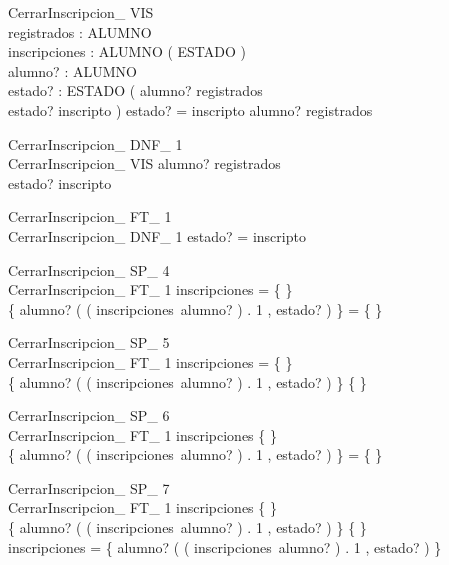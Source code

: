 \documentclass{article}
\begin{document}
\begin{schema}{CerrarInscripcion\_ VIS}\\
  registrados : \power ALUMNO \\
  inscripciones : ALUMNO \pfun ( \nat \cross ESTADO ) \\
  alumno? : ALUMNO \\
  estado? : ESTADO 
 \where
  ( alumno? \in registrados \\
  estado? \neq inscripto ) \lor estado? = inscripto \lor alumno? \notin registrados
 \end{schema}
 
 
 \begin{schema}{CerrarInscripcion\_ DNF\_ 1}\\
  CerrarInscripcion\_ VIS 
 \where
  alumno? \in registrados \\
  estado? \neq inscripto
 \end{schema}
 
 
 \begin{schema}{CerrarInscripcion\_ FT\_ 1}\\
  CerrarInscripcion\_ DNF\_ 1 
 \where
  estado? = inscripto
 \end{schema}
 
 
 \begin{schema}{CerrarInscripcion\_ SP\_ 4}\\
  CerrarInscripcion\_ FT\_ 1 
 \where
  inscripciones = \{ \} \\
  \{ alumno? \mapsto ( ( inscripciones~alumno? ) . 1 , estado? ) \} = \{ \}
 \end{schema}
 
 
 \begin{schema}{CerrarInscripcion\_ SP\_ 5}\\
  CerrarInscripcion\_ FT\_ 1 
 \where
  inscripciones = \{ \} \\
  \{ alumno? \mapsto ( ( inscripciones~alumno? ) . 1 , estado? ) \} \neq \{ \}
 \end{schema}
 
 
 \begin{schema}{CerrarInscripcion\_ SP\_ 6}\\
  CerrarInscripcion\_ FT\_ 1 
 \where
  inscripciones \neq \{ \} \\
  \{ alumno? \mapsto ( ( inscripciones~alumno? ) . 1 , estado? ) \} = \{ \}
 \end{schema}
 
 
 \begin{schema}{CerrarInscripcion\_ SP\_ 7}\\
  CerrarInscripcion\_ FT\_ 1 
 \where
  inscripciones \neq \{ \} \\
  \{ alumno? \mapsto ( ( inscripciones~alumno? ) . 1 , estado? ) \} \neq \{ \} \\
  \dom inscripciones = \dom \{ alumno? \mapsto ( ( inscripciones~alumno? ) . 1 , estado? ) \}
 \end{schema}
 
\end{document}
